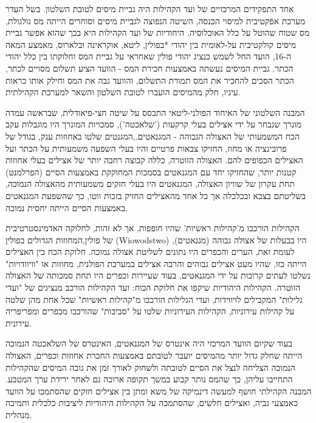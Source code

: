 
אחד התפקידים המרכזיים של ועד הקהילות היה גביית מיסים לטובת השלטון. בשל העדר מערכת אפקטיבית למיסוי הכנסה, השיטה הנפוצה לגביית מיסים וסוחרים הייתה מס גולגולת, מס שטוח שהוטל על כלל האוכלוסיה. היחודיות של ועד הקהילות היא בכך שהוא אפשר גביית מיסים קולקטיבית על-לאומית בין יהודי *בפולין, ליטא, אוקראינה ובלארוס, מאמצע המאה ה-16, הועד החל לשמש כנציג יהודי פולין שאחראי על גביית המס וחלוקתו בין כלל יהודי הכתר. גביית המיסים נעשתה באמצעות חכירת המס - הוועד הציע תשלום מסויים לכתר, הכתר הסכים להחכיר את המס תמורת התשלום, והוועד גבה את המס וחילק אותו כראות עיניו, חלק מהמיסים הועברו לטובת השלטון והשאר למערכת הקהילתית. 

המבנה השלטוני של האיחוד הפולני-ליטאי התבסס על שיטה חצי-פיאודלית, שבראשה עמדה מונרך שנבחר על ידי אצילים בעלי קרקעות ('שלאכטה'), סמכויות המונרך היו מוגבלות עקב הכח המשמעותי של האצולה הגבוהה - המגנאטים.,המגנטים שלטו באחוזות ענק, בגודל של פרובינציה או מחוז, החזיקו צבאות פרטיים והיו בעלי השפעה משמעותית על הכתר ועל האצילים הכפופים להם. האצולה הזוטרה, כללה קבוצה רחבה יותר של אצילים בעלי אחוזות קטנות יותר, שהחזיקו יחד עם המגנאטים בסמכות המחוקקת  באמצעות הסיים (הפרלמנט) תחת עקרון של שוויון האצולה, המגנאטים היו בעלי חזקים משמעותית מהאצולה הנמוכה, בשליטתם בצבא ובכלכלה אך כל אחד מהאצילים החזיק בזכות ווטו, כך שהשפעת המגנאטים באמצעות הסיים הייתה יחסית נמוכה.

הקהילות הורכבו מ'קהילות ראשיות' שהיו חופפות, אך לא זהות, לחלוקה האדמינסטרטיבית של פולין,המחוזות הגדולים בפולין (Wiowodstwo) היו בבעלות של אצולה גבוהה (מגנאטים), לעומת זאת, הערים והכפרים היו נתונים לשליטת אצולה נמוכה. חלוקת הכח בין האצילים הייתה כזו, שהיו מעט אצילים גבוהים והרבה אצילים 
במערכת הפולנית, מחוזות או "וויוודויות" נשלטו לעתים קרובות על ידי המגנאטים, בעוד שעיירות וכפרים היו תחת סמכותה של האצולה הזוטרה. הקהילות היהודיות שיקפו את חלוקת הכוח: ועד הקהילות הורכב מנציגים של "ועדי גלילות" המקבילים לויווידות, ועדי הגלילות הורכבו מ"קהילות ראשיות" שכל אחת מהן שלטה על קהילות עירוניות, הקהילות העירוניות שלטו על "סביבות" שהורכבו מכפרים ומפריפריה עירונית.

בעוד שקיום הוועד המרכזי היה אינטרס של המגנאטים, האינטרס של השלאכטה הנמוכה הייתה שחלק גדול יותר מהמיסים יועבר לטובתם באמצעות החכרת אחוזות וכפרים, האצולה הנמוכה הצליחה לנצל את הסיים לטובתה ולשחוק לאורך זמן את גובה המיסים שהקהילות התחייבו עליהן, כך שהמס נותר קבוע במשך תקופה ארוכה גם לאחר ירידת ערך המטבע.  המבנה הקהילתי חושף למעשה דינמיקה של משא ומתן בין אצילים חזקים שהסתמכו על הוועד כאמצעי גביה, ואצילים חלשים, שהסתמכה על הקהילות היהודיות ליציבות כלכלית ותמיכה מנהלית. 

